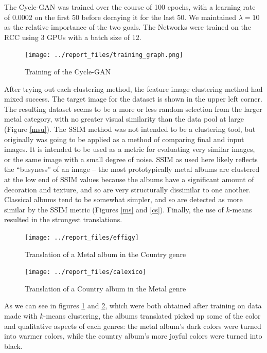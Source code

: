 \documentclass{article}
\begin{document}
The Cycle-GAN was trained over the course of 100 epochs, with a learning rate of 0.0002 on the first 50 before decaying it for the last 50. We maintained $\lambda = 10$ as the relative importance of the two goals. The Networks were trained on the RCC using 3 GPUs with a batch size of 12.

\begin{figure}[h!]
\centering
\texttt{[image: ../report\_files/training\_graph.png]}
\caption{Training of the Cycle-GAN}
\end{figure}

After trying out each clustering method, the feature image clustering method \cite{5696720} had mixed success. The target image for the dataset is shown in the upper left corner. The resulting dataset seems to be a more or less random selection from the larger metal category, with no greater visual similarity than the data pool at large (Figure \ref{msu}). The SSIM method was not intended to be a clustering tool, but originally was going to be applied as a method of comparing final and input images. It is intended to be used as a metric for evaluating very similar images, or the same image with a small degree of noise. SSIM as used here likely reflects the “busyness” of an image – the most prototypically metal albums are clustered at the low end of SSIM values because the albums have a significant amount of decoration and texture, and so are very structurally dissimilar to one another. Classical albums tend to be somewhat simpler, and so are detected as more similar by the SSIM metric (Figures \ref{ms} and \ref{cs}). Finally, the use of $k$-means resulted in the strongest translations.

\begin{figure}[h!]
\centering
\texttt{[image: ../report\_files/effigy]}
\caption{Translation of a Metal album in the Country genre}
\label{m2c}
\end{figure}
\begin{figure}[h!]
\centering
\texttt{[image: ../report\_files/calexico]}
\caption{Translation of a Country album in the Metal genre}
\label{c2m}
\end{figure}

As we can see in figures \ref{m2c} and \ref{c2m}, which were both obtained after training on data made with $k$-means clustering, the albums translated picked up some of the color and qualitative aspects of each genres: the metal album's dark colors were turned into warmer colors, while the country album's more joyful colors were turned into black.
\end{document}
